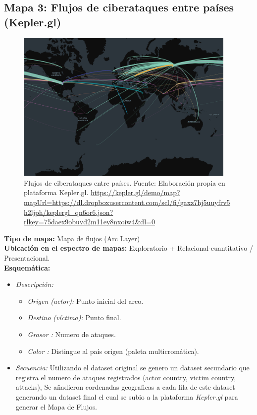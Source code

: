 \documentclass[12pt, a4paper]{article}
\begin{document}
\vspace{1em}
\subsection*{Mapa 3: Flujos de ciberataques entre países (Kepler.gl)}

\begin{figure}[H]
    \centering
    \includegraphics[width=0.95\textwidth]{images/Arc_Layer.png}
    \caption{Flujos de ciberataques entre países. Fuente: Elaboración propia en plataforma Kepler.gl. \url{https://kepler.gl/demo/map?mapUrl=https://dl.dropboxusercontent.com/scl/fi/gaxz7hj5uuyfrv5h2ljph/keplergl_qn6or6.json?rlkey=75daex9obuvd2m11ey8nxoiw4&dl=0}}
\end{figure}

\textbf{Tipo de mapa:} Mapa de flujos (Arc Layer) \\
\textbf{Ubicación en el espectro de mapas:} Exploratorio + Relacional-cuantitativo / Presentacional. \\

\textbf{Esquemática:} \\
\begin{itemize}
    \item \textit{Descripción:} 
        \begin{itemize}
            \item \textit{Origen (actor): } Punto inicial del arco.
            \item \textit{Destino (víctima): } Punto final.
            \item \textit{Grosor : } Numero de ataques.
            \item \textit{Color : } Distingue al país origen (paleta multicromática).
        \end{itemize}
    \item \textit{Secuencia:} Utilizando el dataset original se genero un dataset secundario que registra el numero de ataques registrados (actor country, victim country, attacks), Se añadieron cordenadas geograficas a cada fila de este dataset generando un dataset final el cual se subio a la plataforma \textit{Kepler.gl} para generar el Mapa de Flujos.
\end{itemize}
\end{document}
